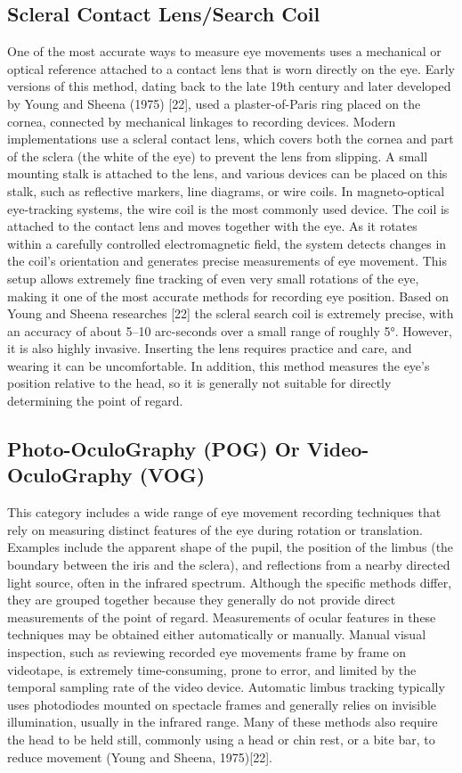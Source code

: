 \documentclass[12pt]{report}
\begin{document}
\subsection{Scleral Contact Lens/Search Coil}

One of the most accurate ways to measure eye movements uses a mechanical or optical reference attached to a contact lens that is worn directly on the eye. 
Early versions of this method, dating back to the late 19th century and later developed by Young and Sheena (1975) [22], used a plaster-of-Paris ring placed on the cornea, connected by mechanical linkages to recording devices.
Modern implementations use a scleral contact lens, which covers both the cornea and part of the sclera (the white of the eye) to prevent the lens from slipping.
A small mounting stalk is attached to the lens, and various devices can be placed on this stalk, such as reflective markers, line diagrams, or wire coils.
In magneto-optical eye-tracking systems, the wire coil is the most commonly used device. The coil is attached to the contact lens and moves together with the eye. 
As it rotates within a carefully controlled electromagnetic field, the system detects changes in the coil's orientation and generates precise measurements of eye movement. This setup allows extremely fine tracking of even very small rotations of the eye, making it one of the most accurate methods for recording eye position.
Based on Young and Sheena researches [22] the scleral search coil is extremely precise, with an accuracy of about 5–10 arc-seconds over a small range of roughly 5°. 
However, it is also highly invasive. 
Inserting the lens requires practice and care, and wearing it can be uncomfortable. 
In addition, this method measures the eye's position relative to the head, so it is generally not suitable for directly determining the point of regard.
\sloppy
\subsection{Photo-OculoGraphy (POG) Or Video-OculoGraphy (VOG)}
\fussy
This category includes a wide range of eye movement recording techniques that rely on measuring distinct features of the eye during rotation or translation. 
Examples include the apparent shape of the pupil, the position of the limbus (the boundary between the iris and the sclera), and reflections from a nearby directed light source, often in the infrared spectrum. 
Although the specific methods differ, they are grouped together because they generally do not provide direct measurements of the point of regard. 
Measurements of ocular features in these techniques may be obtained either automatically or manually.
Manual visual inspection, such as reviewing recorded eye movements frame by frame on videotape, is extremely time-consuming, prone to error, and limited by the temporal sampling rate of the video device.
Automatic limbus tracking typically uses photodiodes mounted on spectacle frames and generally relies on invisible illumination, usually in the infrared range. Many of these methods also require the head to be held still, commonly using a head or chin rest, or a bite bar, to reduce movement (Young and Sheena, 1975)[22].
\end{document}
